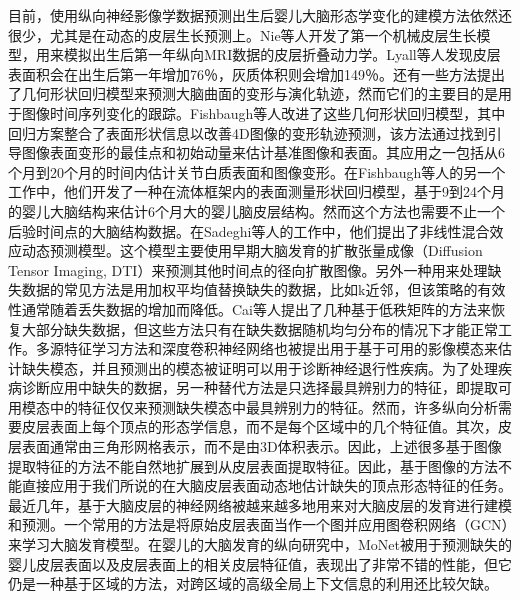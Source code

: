 目前，使用纵向神经影像学数据预测出生后婴儿大脑形态学变化的建模方法依然还很少，尤其是在动态的皮层生长预测上。Nie等人\cite{nie2012computational}开发了第一个机械皮层生长模型，用来模拟出生后第一年纵向MRI数据的皮层折叠动力学。Lyall等人\cite{lyall2015dynamic}发现皮层表面积会在出生后第一年增加76％，灰质体积则会增加149％。还有一些方法\cite{nie2012computational,fletcher2013geodesic}提出了几何形状回归模型来预测大脑曲面的变形与演化轨迹，然而它们的主要目的是用于图像时间序列变化的跟踪。Fishbaugh等人\cite{fishbaugh2014geodesic}改进了这些几何形状回归模型，其中回归方案整合了表面形状信息以改善4D图像的变形轨迹预测，该方法通过找到引导图像表面变形的最佳点和初始动量来估计基准图像和表面。其应用之一包括从6个月到20个月的时间内估计关节白质表面和图像变形。在Fishbaugh等人的另一个工作中\cite{fishbaugh2013geodesic}，他们开发了一种在流体框架内的表面测量形状回归模型，基于9到24个月的婴儿大脑结构来估计6个月大的婴儿脑皮层结构。然而这个方法也需要不止一个后验时间点的大脑结构数据。在Sadeghi等人\cite{sadeghi2014subject}的工作中，他们提出了非线性混合效应动态预测模型。这个模型主要使用早期大脑发育的扩散张量成像（Diffusion Tensor Imaging, DTI）来预测其他时间点的径向扩散图像。另外一种用来处理缺失数据的常见方法是用加权平均值替换缺失的数据，比如k近邻\cite{ching2010weighted}，但该策略的有效性通常随着丢失数据的增加而降低。Cai等人\cite{cai2010singular}提出了几种基于低秩矩阵的方法来恢复大部分缺失数据，但这些方法只有在缺失数据随机均匀分布的情况下才能正常工作。多源特征学习方法\cite{yuan2012multi}和深度卷积神经网络\cite{li2014deep}也被提出用于基于可用的影像模态来估计缺失模态，并且预测出的模态被证明可以用于诊断神经退行性疾病。为了处理疾病诊断应用中缺失的数据，另一种替代方法是只选择最具辨别力的特征，即提取可用模态中的特征仅仅来预测缺失模态中最具辨别力的特征\cite{thung2014neurodegenerative}。然而，许多纵向分析需要皮层表面上每个顶点的形态学信息，而不是每个区域中的几个特征值。其次，皮层表面通常由三角形网格表示，而不是由3D体积表示。因此，上述很多基于图像提取特征的方法\cite{li2014deep,thung2014neurodegenerative}不能自然地扩展到从皮层表面提取特征。因此，基于图像的方法不能直接应用于我们所说的在大脑皮层表面动态地估计缺失的顶点形态特征的任务。最近几年，基于大脑皮层的神经网络被越来越多地用来对大脑皮层的发育进行建模和预测。一个常用的方法是将原始皮层表面当作一个图并应用图卷积网络（GCN）\cite{gopinath2019adaptive,gopinath2019graph}来学习大脑发育模型。在婴儿的大脑发育的纵向研究中，MoNet\cite{monti2017geometric}被用于预测缺失的婴儿皮层表面\cite{liu2019deep}以及皮层表面上的相关皮层特征值，表现出了非常不错的性能，但它仍是一种基于区域的方法，对跨区域的高级全局上下文信息的利用还比较欠缺。


